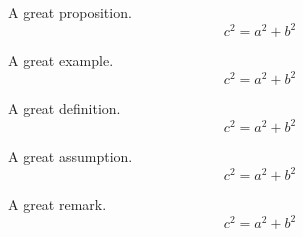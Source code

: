 \begin{proposition}[My proposition]
	A great proposition.
	\begin{equation}
		c^2=a^2+b^2
	\end{equation}
\end{proposition}

\begin{example}[My example]
	A great example.
	\begin{equation}
		c^2=a^2+b^2
	\end{equation}
\end{example}

\begin{definition}[My definition]
	A great definition.
	\begin{equation}
		c^2=a^2+b^2
	\end{equation}
\end{definition}

\begin{assumption}[My assumption]
	A great assumption.
	\begin{equation}
		c^2=a^2+b^2
	\end{equation}
\end{assumption}

\begin{remark}[My remark]
	A great remark.
	\begin{equation}
		c^2=a^2+b^2
	\end{equation}
\end{remark}
